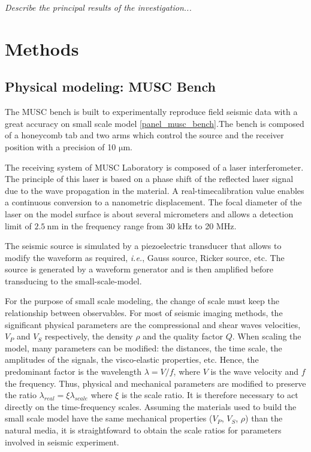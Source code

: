\documentclass[manuscript,revised]{geophysics}
\begin{document}
\noindent \textit{Describe the principal results of the investigation...}


\section{Methods}

\subsection{Physical modeling: MUSC Bench}

\noindent The MUSC bench \citep{Bretaudeau_SSA_2008b,Bretaudeau_SSM_2011,Bretaudeau_FWI_2013} is built to experimentally reproduce field seismic data with a great accuracy on small scale model \ref{panel_musc_bench}.The bench is composed of a honeycomb tab and two arms which control the source and the receiver position with a precision of 10 $\mathrm{\mu m}$.

\noindent The receiving system of MUSC Laboratory is composed of a laser interferometer. The principle of this laser is based on a phase shift of the reflected laser signal due to the wave propagation in the material. A real-timecalibration value enables a continuous conversion to a nanometric displacement. The focal diameter of the laser on the model surface is about several micrometers and allows a detection limit of $\mathrm{2.5\ nm}$ in the frequency range from 30 kHz to 20 MHz.

\noindent The seismic source is simulated by a piezoelectric transducer that allows to modify the waveform as required, \textit{i.e.}, Gauss source, Ricker source, etc. The source is generated by a waveform generator and is then amplified before transducing to the small-scale-model.

\noindent For the purpose of small scale modeling, the change of scale must keep the relationship between observables. For most of seismic imaging methods, the significant physical parameters are the compressional and shear waves velocities, $V_{P}$ and $V_{S}$ respectively, the density $\rho$ and the quality factor $Q$. When scaling the model, many parameters can be modified: the distances, the time scale, the amplitudes of the signals, the visco-elastic properties, etc. Hence, the predominant factor is the wavelength $\lambda = V / f$, where $V$ is the wave velocity and $f$ the frequency. Thus, physical and mechanical parameters are modified to preserve the ratio $\lambda_{real} = \xi \lambda_{scale}$ where $\xi$ is the scale ratio. It is therefore necessary to act directly on the time-frequency scales. Assuming the materials used to build the small scale model have the same mechanical properties ($V_{P}$, $V_{S}$, $\rho$) than the natural media, it is straightfoward to obtain the scale ratios for parameters involved in seismic experiment.
\end{document}
